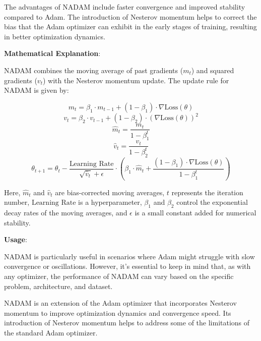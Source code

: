 \documentclass{report}
\begin{document}
The advantages of NADAM include faster convergence and improved stability compared to Adam. The introduction of Nesterov momentum helps to correct the bias that the Adam optimizer can exhibit in the early stages of training, resulting in better optimization dynamics.

\textbf{Mathematical Explanation}:

NADAM combines the moving average of past gradients (\(m_t\)) and squared gradients (\(v_t\)) with the Nesterov momentum update. The update rule for NADAM is given by:

\[ m_t = \beta_1 \cdot m_{t-1} + (1 - \beta_1) \cdot \nabla \text{Loss}(\theta) \]
\[ v_t = \beta_2 \cdot v_{t-1} + (1 - \beta_2) \cdot (\nabla \text{Loss}(\theta))^2 \]
\[ \hat{m}_t = \frac{m_t}{1 - \beta_1^t} \]
\[ \hat{v}_t = \frac{v_t}{1 - \beta_2^t} \]
\[ \theta_{t+1} = \theta_t - \frac{\text{Learning Rate}}{\sqrt{\hat{v}_t} + \epsilon} \cdot (\beta_1 \cdot \hat{m}_t + \frac{(1 - \beta_1) \cdot \nabla \text{Loss}(\theta)}{1 - \beta_1^t}) \]

Here, \(\hat{m}_t\) and \(\hat{v}_t\) are bias-corrected moving averages, \(t\) represents the iteration number, \(\text{Learning Rate}\) is a hyperparameter, \(\beta_1\) and \(\beta_2\) control the exponential decay rates of the moving averages, and \(\epsilon\) is a small constant added for numerical stability.

\textbf{Usage}:

NADAM is particularly useful in scenarios where Adam might struggle with slow convergence or oscillations. However, it's essential to keep in mind that, as with any optimizer, the performance of NADAM can vary based on the specific problem, architecture, and dataset.

NADAM is an extension of the Adam optimizer that incorporates Nesterov momentum to improve optimization dynamics and convergence speed. Its introduction of Nesterov momentum helps to address some of the limitations of the standard Adam optimizer.
\end{document}
